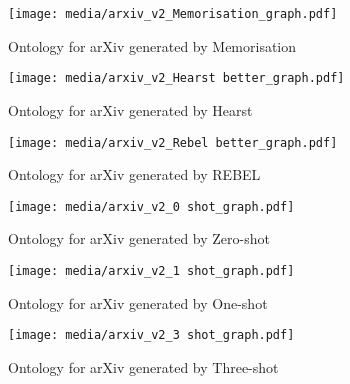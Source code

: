 
\begin{figure}[h]
    \centering
    \texttt{[image: media/arxiv\_v2\_Memorisation\_graph.pdf]}
    \caption{Ontology for arXiv generated by Memorisation}
\end{figure}


\begin{figure}[h]
    \centering
    \texttt{[image: media/arxiv\_v2\_Hearst better\_graph.pdf]}
    \caption{Ontology for arXiv generated by Hearst}
    \label{fig:hearst-arxiv}
\end{figure}


\begin{figure}[h]
    \centering
    \texttt{[image: media/arxiv\_v2\_Rebel better\_graph.pdf]}
    \caption{Ontology for arXiv generated by REBEL}
    \label{fig:rebel-arxiv}
\end{figure}


\begin{figure}[h]
    \centering
    \texttt{[image: media/arxiv\_v2\_0 shot\_graph.pdf]}
    \caption{Ontology for arXiv generated by Zero-shot}
\end{figure}

\begin{figure}[h]
    \centering
    \texttt{[image: media/arxiv\_v2\_1 shot\_graph.pdf]}
    \caption{Ontology for arXiv generated by One-shot}
\end{figure}

\begin{figure}[h]
    \centering
    \texttt{[image: media/arxiv\_v2\_3 shot\_graph.pdf]}
    \caption{Ontology for arXiv generated by Three-shot}
    \label{fig:3shot-arxiv}
\end{figure}

